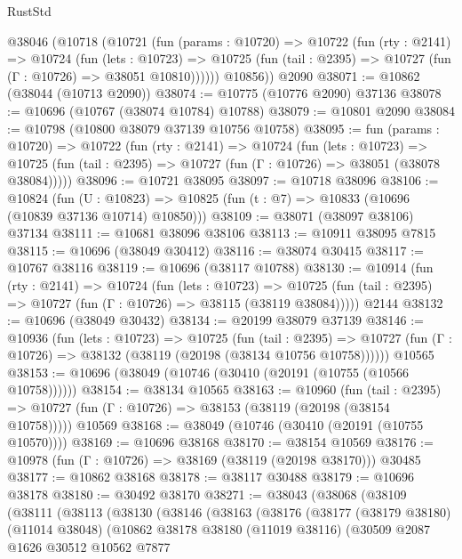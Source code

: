 \begin{lexlean}{RustStd}
\begin{coremodule}
    @38046
      (@10718
        (@10721
          (fun (params : @10720) =>
          @10722
            (fun (rty : @2141) =>
            @10724
              (fun (lets : @10723) =>
              @10725 (fun (tail : @2395) => @10727 (fun (Γ : @10726) => @38051 @10810))))))
        @10856))
    @2090
@38071 := @10862 (@38044 (@10713 @2090))
@38074 := @10775 (@10776 @2090) @37136
@38078 := @10696 (@10767 (@38074 @10784) @10788)
@38079 := @10801 @2090
@38084 := @10798 (@10800 @38079 @37139 @10756 @10758)
@38095 := fun (params : @10720) =>
  @10722
    (fun (rty : @2141) =>
    @10724
      (fun (lets : @10723) =>
      @10725 (fun (tail : @2395) => @10727 (fun (Γ : @10726) => @38051 (@38078 @38084)))))
@38096 := @10721 @38095
@38097 := @10718 @38096
@38106 := @10824
    (fun (U : @10823) => @10825 (fun (t : @7) => @10833 (@10696 (@10839 @37136 @10714) @10850)))
@38109 := @38071 (@38097 @38106) @37134
@38111 := @10681 @38096 @38106
@38113 := @10911 @38095 @7815
@38115 := @10696 (@38049 @30412)
@38116 := @38074 @30415
@38117 := @10767 @38116
@38119 := @10696 (@38117 @10788)
@38130 := @10914
    (fun (rty : @2141) =>
    @10724
      (fun (lets : @10723) =>
      @10725 (fun (tail : @2395) => @10727 (fun (Γ : @10726) => @38115 (@38119 @38084)))))
    @2144
@38132 := @10696 (@38049 @30432)
@38134 := @20199 @38079 @37139
@38146 := @10936
    (fun (lets : @10723) =>
    @10725
      (fun (tail : @2395) =>
      @10727 (fun (Γ : @10726) => @38132 (@38119 (@20198 (@38134 @10756 @10758))))))
    @10565
@38153 := @10696 (@38049 (@10746 (@30410 (@20191 (@10755 (@10566 @10758))))))
@38154 := @38134 @10565
@38163 := @10960
    (fun (tail : @2395) => @10727 (fun (Γ : @10726) => @38153 (@38119 (@20198 (@38154 @10758)))))
    @10569
@38168 := @38049 (@10746 (@30410 (@20191 (@10755 @10570))))
@38169 := @10696 @38168
@38170 := @38154 @10569
@38176 := @10978 (fun (Γ : @10726) => @38169 (@38119 (@20198 @38170))) @30485
@38177 := @10862 @38168
@38178 := @38117 @30488
@38179 := @10696 @38178
@38180 := @30492 @38170
@38271 := @38043
    (@38068
      (@38109
        (@38111
          (@38113
            (@38130
              (@38146
                (@38163
                  (@38176
                    (@38177
                      (@38179 @38180)
                      (@11014 @38048)
                      (@10862
                        @38178
                        @38180
                        (@11019 @38116)
                        (@30509
                          @2087
                          @1626
                          @30512
                          @10562
                          @7877

\end{coremodule}
\end{lexlean}
